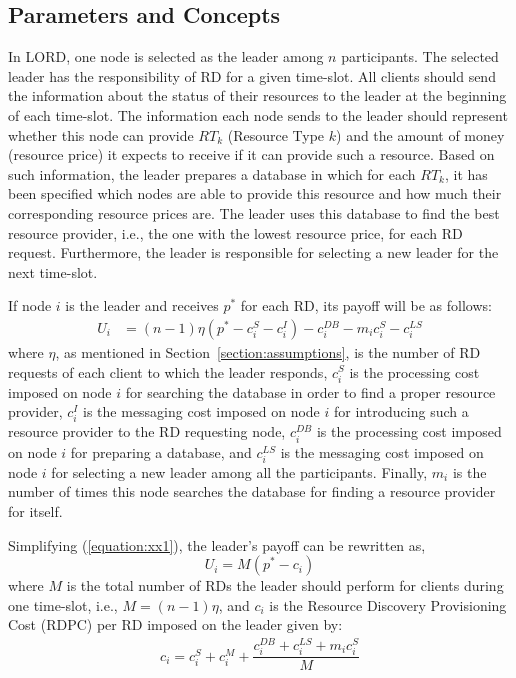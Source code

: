 \documentclass[journal,12pt, onecolumn]{IEEEtran}
\begin{document}
\subsection{Parameters and Concepts}\label{section:parameters}

In LORD, one node is selected as the leader among $n$ participants. The selected leader has the responsibility of RD for a given time-slot. All clients should send the information about the status of their resources to the leader at the beginning of each time-slot. The information each node sends to the leader should represent whether this node can provide $RT_{k}$ (Resource Type $k$) and the amount of money (resource price) it expects to receive if it can provide such a resource. Based on such information, the leader prepares a database in which for each $RT_{k}$, it has been specified which nodes are able to provide this resource and how much their corresponding resource prices are. The leader uses this database to find the best resource provider, i.e., the one with the lowest resource price, for each RD request. Furthermore, the leader is responsible for selecting a new leader for the next time-slot.

If node $i$ is the leader and receives $p^*$ for each RD, its payoff will be as follows:
\begin{align}
\label{equation:xx1}
U_i &= (n-1)\eta(p^* - c_i^{S}- c_i^{I}) - c_i ^{DB}-m_i c_i^{S} - c_i ^{LS}
\end{align}
where $\eta$, as mentioned in Section~\ref{section:assumptions}, is the number of RD requests of each client to which the leader responds, $c_i^{S}$ is the processing cost imposed on node $i$ for searching the database in order to find a proper resource provider, $c_i^{I}$ is the messaging cost imposed on node $i$ for introducing such a resource provider to the RD requesting node, $c_i^{DB}$ is the processing cost imposed on node $i$ for preparing a database, and $c_i^{LS}$ is the messaging cost imposed on node $i$ for selecting a new leader among all the participants.  Finally, $m_i$ is the number of times this node searches the database for finding a resource provider for itself.



Simplifying (\ref{equation:xx1}), the leader's payoff can be rewritten as,
\begin{equation}
\label{equation:xx2}
U_i =  M(p^* - c_i)
\end{equation}
where $M$ is the total number of RDs the leader should perform for clients during one time-slot, i.e., $ M=(n-1)\eta$, and $c_i$ is the Resource Discovery Provisioning Cost (RDPC) per RD imposed on the leader given by:
\begin{align}
\label{equation:xx3}
c_i = c_i ^{S} +c_i ^{M} + \dfrac{c_i ^{DB} + c_i ^{LS} + m_i c_i ^{S}}{M}
\end{align} 
\end{document}
